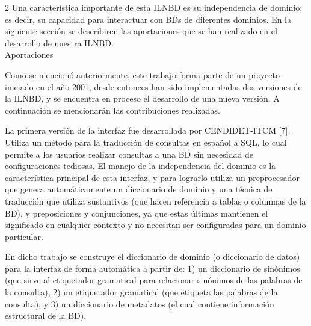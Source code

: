 \documentclass[letterpaper,10pt,final,hyphenatedtitles]{papertexKS}
\begin{document}
\begin{news}{2}
Una característica importante de esta ILNBD es su independencia de dominio; es decir, su capacidad para interactuar con BDs de diferentes dominios. En la siguiente sección se describiren las aportaciones que se han realizado en el desarrollo de nuestra ILNBD.
\\

\noindent\textcolor{color}{\Large{Aportaciones}}

Como se mencionó anteriormente, este trabajo forma parte de un proyecto iniciado en el  año 2001, desde entonces han sido implementadas dos versiones de la ILNBD, y se encuentra en proceso el desarrollo de una nueva versión. A continuación se mencionarán las contribuciones realizadas.

La primera versión de la interfaz fue desarrollada por CENDIDET-ITCM [7]. Utiliza un método para la traducción de consultas en español a SQL, lo cual permite a los usuarios realizar consultas a una BD sin necesidad de configuraciones tediosas. El manejo de la independencia del dominio es la característica principal de esta interfaz, y para lograrlo utiliza un preprocesador que genera automáticamente un diccionario de dominio y una técnica de traducción que utiliza sustantivos (que hacen referencia a tablas o columnas de la BD), y preposiciones y conjunciones, ya que estas últimas mantienen el significado en cualquier contexto y no necesitan ser configuradas para un dominio particular.
	
En dicho trabajo se construye el diccionario de dominio (o diccionario de datos) para la interfaz de forma automática a partir de: 1) un diccionario de sinónimos (que sirve al etiquetador gramatical para relacionar sinónimos de las palabras de la consulta), 2) un etiquetador gramatical (que etiqueta las palabras de la consulta), y 3) un diccionario de metadatos (el cual contiene información estructural de la BD).


\end{news}
\end{document}
